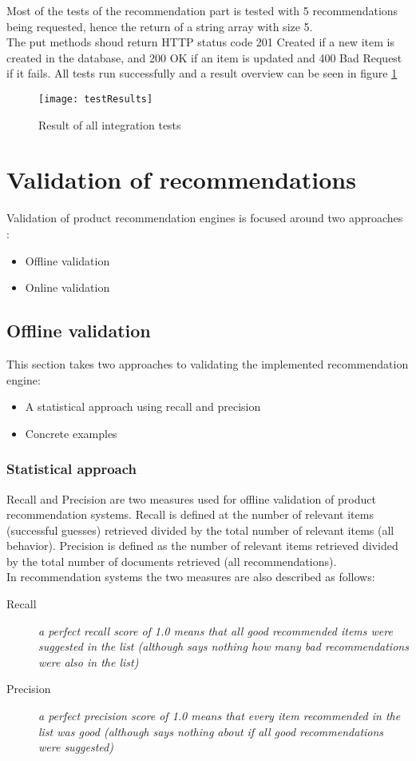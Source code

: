 Most of the tests of the recommendation part is tested with 5 recommendations being requested, hence the return of a string array with size 5. \\
The put methods shoud return HTTP status code 201 Created if a new item is created in the database, and 200 OK if an item is updated and 400 Bad Request if it fails.
All tests run successfully and a result overview can be seen in figure \ref{testResult}
\begin{figure}[H]
\centering
\texttt{[image: testResults]}
\caption{Result of all integration tests}
\label{testResult}
\end{figure}


\section{Validation of recommendations}

Validation of product recommendation engines is focused around two approaches \cite{eval}:
\begin{itemize}
	\item Offline validation
	\item Online validation
\end{itemize}


\subsection{Offline validation}
This section takes two approaches to validating the implemented recommendation engine:
\begin{itemize}
	\item A statistical approach using recall and precision
	\item Concrete examples
\end{itemize}

\subsubsection{Statistical approach}
Recall and Precision are two measures used for offline validation of product recommendation systems. Recall is defined at the number of relevant items (successful guesses) retrieved divided by the total number of relevant items (all behavior). Precision is defined as the number of relevant items retrieved divided by the total number of documents retrieved (all recommendations). \\ In recommendation systems the two measures are also described as follows: 
\begin{description}
	\item [Recall] \textit{a perfect recall score of 1.0 means that all good recommended items were suggested in the list (although says nothing how many bad recommendations were also in the list)} \cite{recallAndPrecision}
	\item [Precision] \textit{a perfect precision score of 1.0 means that every item recommended in the list was good (although says nothing about if all good recommendations were suggested)} \cite{recallAndPrecision}
\end{description}

